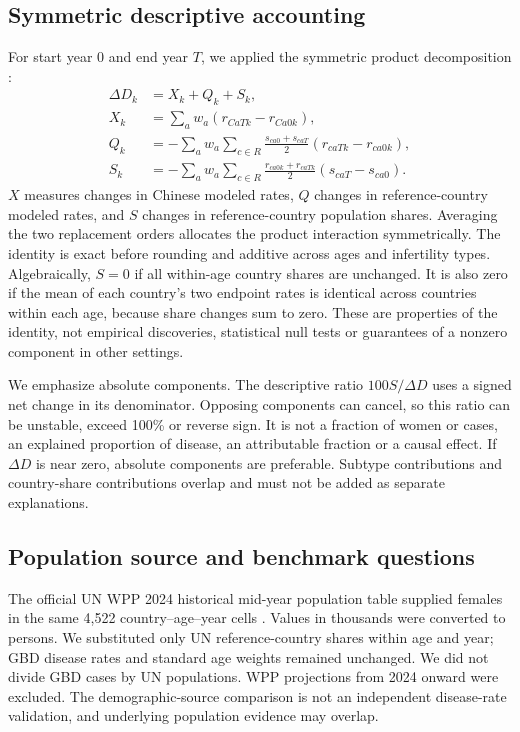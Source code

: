 \documentclass[11pt,a4paper]{article}
\begin{document}
\subsection{Symmetric descriptive accounting}
For start year 0 and end year $T$, we applied the symmetric product decomposition \citep{kitagawa}:
\begin{align}
 \Delta D_k &=X_k+Q_k+S_k,\\
 X_k&=\sum_a w_a(r_{CaTk}-r_{Ca0k}),\\
 Q_k&=-\sum_a w_a\sum_{c\in R}\frac{s_{ca0}+s_{caT}}{2}(r_{caTk}-r_{ca0k}),\\
 S_k&=-\sum_a w_a\sum_{c\in R}\frac{r_{ca0k}+r_{caTk}}{2}(s_{caT}-s_{ca0}).
\end{align}
$X$ measures changes in Chinese modeled rates, $Q$ changes in reference-country modeled rates, and $S$ changes in reference-country population shares. Averaging the two replacement orders allocates the product interaction symmetrically. The identity is exact before rounding and additive across ages and infertility types. Algebraically, $S=0$ if all within-age country shares are unchanged. It is also zero if the mean of each country's two endpoint rates is identical across countries within each age, because share changes sum to zero. These are properties of the identity, not empirical discoveries, statistical null tests or guarantees of a nonzero component in other settings.

We emphasize absolute components. The descriptive ratio $100S/\Delta D$ uses a signed net change in its denominator. Opposing components can cancel, so this ratio can be unstable, exceed 100\% or reverse sign. It is not a fraction of women or cases, an explained proportion of disease, an attributable fraction or a causal effect. If $\Delta D$ is near zero, absolute components are preferable. Subtype contributions and country-share contributions overlap and must not be added as separate explanations.

\subsection{Population source and benchmark questions}
The official UN WPP 2024 historical mid-year population table supplied females in the same 4,522 country--age--year cells \citep{wpp2024}. Values in thousands were converted to persons. We substituted only UN reference-country shares within age and year; GBD disease rates and standard age weights remained unchanged. We did not divide GBD cases by UN populations. WPP projections from 2024 onward were excluded. The demographic-source comparison is not an independent disease-rate validation, and underlying population evidence may overlap.
\end{document}
